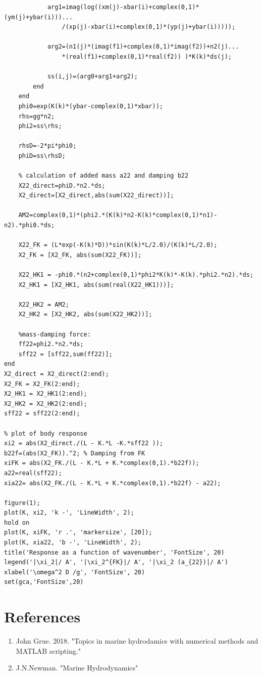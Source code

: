 \documentclass[a4paper,10pt]{article}
\begin{document}
\begin{verbatim}
            arg1=imag(log((xm(j)-xbar(i)+complex(0,1)*(ym(j)+ybar(i)))...
                /(xp(j)-xbar(i)+complex(0,1)*(yp(j)+ybar(i)))));

            arg2=(n1(j)*(imag(f1)+complex(0,1)*imag(f2))+n2(j)...
                *(real(f1)+complex(0,1)*real(f2)) )*K(k)*ds(j);

            ss(i,j)=(arg0+arg1+arg2);
        end
    end
    phi0=exp(K(k)*(ybar-complex(0,1)*xbar));
    rhs=gg*n2;
    phi2=ss\rhs;
    
    rhsD=-2*pi*phi0;
    phiD=ss\rhsD;
    
    % calculation of added mass a22 and damping b22
    X22_direct=phiD.*n2.*ds;
    X2_direct=[X2_direct,abs(sum(X22_direct))];
   
    AM2=complex(0,1)*(phi2.*(K(k)*n2-K(k)*complex(0,1)*n1)-n2).*phi0.*ds;

    X22_FK = (L*exp(-K(k)*D))*sin(K(k)*L/2.0)/(K(k)*L/2.0);
    X2_FK = [X2_FK, abs(sum(X22_FK))];
    
    X22_HK1 = -phi0.*(n2+complex(0,1)*phi2*K(k)*-K(k).*phi2.*n2).*ds;
    X2_HK1 = [X2_HK1, abs(sum(real(X22_HK1)))];
    
    X22_HK2 = AM2;
    X2_HK2 = [X2_HK2, abs(sum(X22_HK2))];
    
    %mass-damping force:
    ff22=phi2.*n2.*ds;
    sff22 = [sff22,sum(ff22)];
end
X2_direct = X2_direct(2:end);
X2_FK = X2_FK(2:end);
X2_HK1 = X2_HK1(2:end);
X2_HK2 = X2_HK2(2:end);
sff22 = sff22(2:end);

% plot of body response
xi2 = abs(X2_direct./(L - K.*L -K.*sff22 ));
b22f=(abs(X2_FK)).^2; % Damping from FK
xiFK = abs(X2_FK./(L - K.*L + K.*complex(0,1).*b22f));
a22=real(sff22);
xia22= abs(X2_FK./(L - K.*L + K.*complex(0,1).*b22f) - a22);

figure(1);
plot(K, xi2, 'k -', 'LineWidth', 2);
hold on
plot(K, xiFK, 'r .', 'markersize', [20]);
plot(K, xia22, 'b -', 'LineWidth', 2);
title('Response as a function of wavenumber', 'FontSize', 20)
legend('|\xi_2|/ A', '|\xi_2^{FK}|/ A', '|\xi_2 (a_{22})|/ A')
xlabel('\omega^2 D /g', 'FontSize', 20)
set(gca,'FontSize',20)
\end{verbatim}

\newpage

\section{References}

\begin{enumerate}
\item John Grue. 2018. "Topics in marine hydrodamics with numerical methods and MATLAB scripting."

\item J.N.Newman. "Marine Hydrodynamics"
\end{enumerate}
\end{document}
